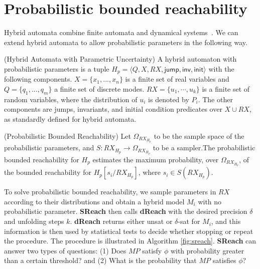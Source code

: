 \section{Probabilistic bounded reachability}

Hybrid automata combine finite automata and dynamical systems~\cite{henzinger2000theory}. We can extend hybrid automata to allow probabilistic parameters in the following way. 

\begin{definition}
\label{def:ha}
{\rm(Hybrid Automata with Parametric Uncertainty)} A hybrid automaton with probabilistic parameters is a tuple $H_p = \langle Q,X,RX,\mathsf{jump},\mathsf{inv},\mathsf{init}\rangle$
with the following components. $X = \{x_1,...,x_n\}$ is a finite set of real variables and $Q=\{q_1,...,q_m\}$ a finite set of discrete modes. $RX = \{ u_1, \cdots, u_k \}$ is a finite set of random variables, where the distribution of $u_i$ is denoted by $P_i$. The other components are jumps, invariants, and initial condition predicates over $X\cup RX$, as standardly defined for hybrid automata.
\end{definition}
\begin{definition}
\label{def:pbr}
{\rm (Probabilistic Bounded Reachability)}
Let $\Omega_{RX_{H_p}}$ to be the sample space of the probabilistic parameters, and $S: RX_{H_p} \to \Omega_{RX_{H_p}}$ to be a sampler.The probabilistic bounded reachability for $H_p$ estimates the maximum probability, over $\Omega_{RX_{H_p}}$, of the bounded reachability for $H_{p}[s_i/RX_{H_p}]$, where $s_i \in S(RX_{H_p})$.
\end{definition}
To solve probabilistic bounded reachability, we sample parameters in $RX$ according 
to their distributions and obtain a hybrid model $M_i$ with no probabilistic 
parameter. {\bf SReach} then calls {\bf dReach} \cite{gaodelta} with the desired precision $\delta$ and 
unfolding steps $k$. {\bf dReach} returns either unsat or $\delta$-sat for $M_i$, and this information
is then used by statistical tests to decide whether stopping or repeat the procedure. The procedure is illustrated in Algorithm \ref{fig:sreach}. {\bf SReach} can answer two types of questions: (1) Does $MP$ satisfy $\phi$ with probability greater than a certain threshold? and (2) What is the probability that $MP$ satisfies $\phi$?
